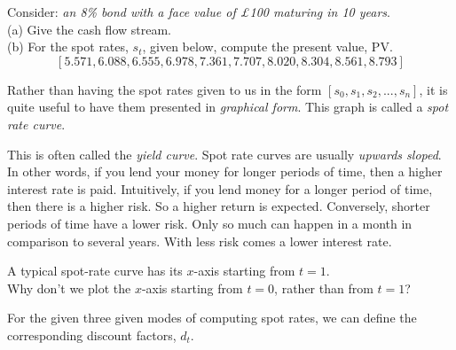 \frmrule 

\begin{example}
Consider: \textit{an 8\% bond with a face value of \pounds100 maturing in 10 years}. \\
(a) Give the cash flow stream. \\
(b) For the spot rates, $s_t$, given below, compute the present value, $\text{PV}$.
 $$[5.571, 6.088, 6.555, 6.978, 7.361, 7.707, 8.020, 8.304, 8.561, 8.793]$$
\end{example}



\frmrule 

Rather than having the spot rates given to us in 
the form $[s_0, s_1, s_2, ..., s_n]$, it is quite useful to 
have them presented in \textit{graphical form}. This 
graph is called a \textit{spot rate curve}.


This is often called the \textit{yield curve}. 
Spot rate curves are usually \textit{upwards sloped}. 
In other words, if you lend your money for longer periods of time, 
then a higher interest rate is paid. Intuitively, if you lend money 
for a longer period of time, then there is a higher risk. So a higher 
return is expected. Conversely, shorter periods of time have a lower 
risk. Only so much can happen in a month in comparison to several years. 
With less risk comes a lower interest rate. 

\frmrule 

\begin{example}
A typical spot-rate curve has its $x$-axis starting from $t = 1$. \\
Why don't we plot the $x$-axis starting from $t = 0$, rather than from $t = 1$? 

\end{example}

\frmrule 

For the given three given modes of computing spot rates, we can define 
the corresponding discount factors, $d_t$. 

\begin{figure}[h]
\end{figure}

